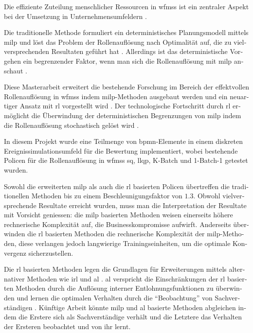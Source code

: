 \begin{otherlanguage}{ngerman}
	\begin{zusammenfassung}
	Die effiziente Zuteilung menschlicher Ressourcen in \glspl{wfms} ist ein zentraler Aspekt bei der Umsetzung in Unternehmensumfeldern \citep{Cheng2000,Mentzas2001}.

	Die traditionelle Methode formuliert ein deterministisches Planungsmodell mittels \gls{milp} und löst das Problem der Rollenauflösung nach Optimalität auf, die zu vielversprechenden Resultaten geführt hat \citep{Zeng2005}. Allerdings ist das deterministische Vorgehen ein begrenzender Faktor, wenn man sich die Rollenauflösung mit \gls{milp} anschaut \citep{Zeng2005}.

	Diese Masterarbeit erweitert die bestehende Forschung im Bereich der effektvollen Rollenauflösung in \glspl{wfms} indem \gls{milp}-Methoden ausgebaut werden und ein neuartiger Ansatz mit \gls{rl} vorgestellt wird \citep{Sutton2017}. Der technologische Fortschritt durch \gls{rl} ermöglicht die Überwindung der deterministischen Begrenzungen von \gls{milp} indem die Rollenauflösung stochastisch gelöst wird \citep{Sutton2017}.

	In diesem Projekt wurde eine Teilmenge von \gls{bpmn}-Elemente in einem diskreten Ereignissimulationsumfeld für die Bewertung implementiert, wobei bestehende Policen für die Rollenauflösung in \glspl{wfms} \zbg \gls{sq}, \gls{llqp}, K-Batch und 1-Batch-1 getestet wurden.

	Sowohl die erweiterten \gls{milp} als auch die \gls{rl} basierten Policen übertreffen die traditionellen Methoden bis zu einem Beschleunigungsfaktor von $1.3$. Obwohl vielversprechende Resultate erreicht wurden, muss man die Interpretation der Resultate mit Vorsicht geniessen: die \gls{milp} basierten Methoden weisen einerseits höhere rechnerische Komplexität auf, die Businesskompromisse aufwirft. Anderseits überwinden die \gls{rl} basierten Methoden die rechnerische Komplexität der \gls{milp}-Methoden, diese verlangen jedoch langwierige Trainingseinheiten, um die optimale Konvergenz sicherzustellen.

	Die \gls{rl} basierten Methoden legen die Grundlagen für Erweiterungen mittels alternativer Methoden wie \zbg \gls{irl} \citep{Ng2000} und \gls{al} \citep{Abbeel2004}. \gls{al} verspricht die Einschränkungen der \gls{rl} basierten Methoden durch die Auflösung interner Entlohnungsfunktionen zu überwinden und lernen die optimalen Verhalten durch die ``Beobachtung'' von Sachverständigen \citep{Abbeel2004}. Künftige Arbeit könnte \gls{milp} und \gls{al} basierte Methoden abgleichen indem die Erstere sich als Sachverständige verhält und die Letztere das Verhalten der Ersteren beobachtet und von ihr lernt.
	\end{zusammenfassung}
\end{otherlanguage}